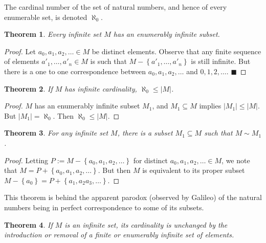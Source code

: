\documentclass[a4paper, 12pt]{article}
\newtheorem{theorem}{Theorem}
\newtheorem{theorem}{Theorem}
\newtheorem{proof}{Proof}
\begin{document}
\begin{definition}
    The cardinal number of the set of natural numbers,
    and hence of every enumerable set, is denoted 
    $\aleph_0$.
\end{definition}

\begin{theorem}
    Every infinite set $M$ has an enumerably infinite subset.
\end{theorem}

\begin{proof}
    Let $a_0, a_1, a_2,\ldots \in M$ be distinct elements. Observe that 
    any finite sequence of elements $a'_1,\ldots, a'_n \in M$
    is such that $M - \left\{ a'_1,\ldots, a'_n \right\} $ is 
    still infinite. But there is a one to one correspondence between 
    $a_0, a_1, a_2,\ldots$ and $0, 1, 2, \ldots$. $\blacksquare$
\end{proof}

\begin{theorem}
    If $M$ has infinite cardinality, $\aleph_0 \leq |M|$.
\end{theorem}

\begin{proof}
    $M$ has an enumerably infinite subset $M_1$,
    and $M_1 \subseteq M$ implies $|M_1| \leq |M|$.
    But $|M_1| = \aleph_0$. Then $\aleph_0 \leq |M|$.
\end{proof}

\begin{theorem}
    For any infinite set $M$, there is a subset $M_1 \subseteq M$ such that 
    $M \sim M_1$.
\end{theorem}

\begin{proof}
    Letting $P := M - \left\{ a_0, a_1, a_2,\ldots \right\} $ for distinct 
    $a_0, a_1, a_2, \ldots \in M$, we note that 
    $M = P + \left\{ a_0,a_1, a_2,\ldots \right\} $.
    But then $M$ is equivalent to its proper subset 
    $M - \left\{ a_0 \right\} = P + \left\{ a_1,a_2 a_3,\ldots \right\} $.
\end{proof}

This theorem is behind the apparent parodox (observed by Galileo)
of the natural numbers being in perfect correspondence to some of 
its subsets.

\begin{theorem}
    If $M$ is an infinite set, its cardinality is unchanged by the 
    introduction or removal of a finite or enumerably infinite set of elements.
\end{theorem}
\end{document}

